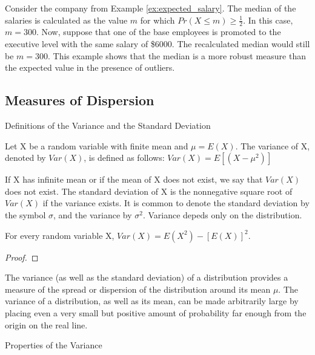 \begin{example}
Consider the company from Example \ref{ex:expected_salary}. The median of the salaries is calculated as the value $m$ for which $Pr\left(X\leq m\right)\geq \frac{1}{2}$. In this case, $m=300$. Now, suppose that one of the base employees is promoted to the executive level with the same salary of \$6000. The recalculated median would still be $m=300$. This example shows that the median is a more robust measure than the expected value in the presence of outliers.
\end{example}


%
%

\subsection{Measures of Dispersion}

Definitions of the Variance and the Standard Deviation

\begin{definition}
Let X be a random variable with finite mean and $\mu=E\left(X\right)$. The variance of X, denoted by $Var\left(X\right)$, is defined as follows: $Var\left(X\right)=E\left[\left(X-\mu^{2}\right)\right]$
\end{definition}

{\color{red} If X has infinite mean or if the mean of X does not exist, we say that $Var\left(X\right)$ does not exist. The standard deviation of X is the nonnegative square root of $Var\left(X\right)$ if the variance exists. It is common to denote the standard deviation by the symbol $\sigma$, and the variance by $\sigma^{2}$. Variance depeds only on the distribution.}

\begin{proposition}
For every random variable X, $Var\left(X\right)=E\left(X^{2}\right)-\left[E\left(X\right)\right]^{2}$.
\end{proposition}
\begin{proof}
\end{proof}

{\color{red} The variance (as well as the standard deviation) of a distribution provides a measure of the spread or dispersion of the distribution around its mean $\mu$. The variance of a distribution, as well as its mean, can be made arbitrarily large by placing even a very small but positive amount of probability far enough from the origin on the real line.}

Properties of the Variance


